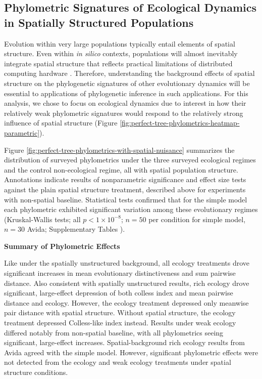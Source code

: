 \subsection{Phylometric Signatures of Ecological Dynamics in Spatially Structured Populations}



Evolution within very large populations typically entail elements of spatial structure.
Even within \textit{in silico} contexts, populations will almost inevitably integrate spatial structure that reflects practical limitations of distributed computing hardware \citep{ackley2014indefinitely,moreno2021conduit}.
Therefore, understanding the background effects of spatial structure on the phylogenetic signatures of other evolutionary dynamics will be essential to applications of phylogenetic inference in such applications.
For this analysis, we chose to focus on ecological dynamics due to interest in how their relatively weak phylometric signatures would respond to the relatively strong influence of spatial structure (Figure \ref{fig:perfect-tree-phylometrics-heatmap-parametric}).



Figure \ref{fig:perfect-tree-phylometrics-with-spatial-nuisance} summarizes the distribution of surveyed phylometrics under the three surveyed ecological regimes and the control non-ecological regime, all with spatial population structure.
Annotations indicate results of nonparametric significance and effect size tests against the plain spatial structure treatment, described above for experiments with non-spatial baseline.
Statistical tests confirmed that for the simple model each phylometric exhibited significant variation among these evolutionary regimes (Kruskal-Wallis tests; all $p < 1\times10^{-8}$; $n=50$ per condition for simple model, $n=30$ Avida; Supplementary Tables ).

\textbf{Summary of Phylometric Effects}

Like under the spatially unstructured background, all ecology treatments drove significant increases in mean evolutionary distinctiveness and sum pairwise distance.
Also consistent with spatially unstructured results, rich ecology drove significant, large-effect depression of both colless index and mean pairwise distance and ecology.
However, the ecology treatment depressed only meanwise pair distance with spatial structure.
Without spatial structure, the ecology treatment depressed Colless-like index instead.
Results under weak ecology differed notably from non-spatial baseline, with all phylometrics seeing significant, large-effect increases.
Spatial-background rich ecology results from Avida agreed with the simple model.
However, significant phylometric effects were not detected from the ecology and weak ecology treatments under spatial structure conditions.

